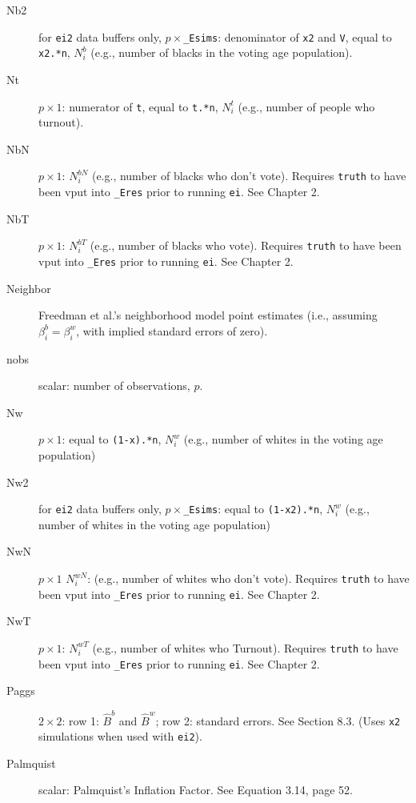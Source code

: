 \documentclass[11pt,titlepage]{article}
\newcommand{\NbN}{{N_i^{bN}}}
\newcommand{\NwN}{{N_i^{wN}}}
\newcommand{\Nbp}{{N_i^{b}}}
\newcommand{\Nwp}{{N_i^{w}}}
\newcommand{\NbV}{{N_i^{bT}}}       %
\newcommand{\NwV}{{N_i^{wT}}}
\begin{document}
\begin{description}
\item[Nb2] for \texttt{ei2} data buffers only,
  $p\times$\texttt{\_Esims}: denominator of \texttt{x2} and
  \texttt{V}, equal to \texttt{x2.*n}, $\Nbp$ (e.g., number of blacks
  in the voting age population).

\item[Nt] $p\times 1$: numerator of \texttt{t}, equal to
  \texttt{t.*n}, $N^t_i$ (e.g., number of people who turnout).

\item[NbN] $p\times1$: $\NbN$ (e.g., number of blacks who don't vote).
  Requires \texttt{truth} to have been vput into \texttt{\_Eres} prior
  to running \texttt{ei}.  See Chapter 2.

\item[NbT] $p\times1$: $\NbV$ (e.g., number of blacks who vote).
  Requires \texttt{truth} to have been vput into \texttt{\_Eres} prior
  to running \texttt{ei}. See Chapter 2.

\item[Neighbor] Freedman et al.'s neighborhood model point estimates
  (i.e., assuming $\beta_i^b=\beta_i^w$, with implied standard errors
  of zero).

\item[nobs] scalar: number of observations, $p$.

\item[Nw] $p\times 1$: equal to \texttt{(1-x).*n}, $\Nwp$ (e.g.,
  number of whites in the voting age population)

\item[Nw2] for \texttt{ei2} data buffers only,
  $p\times$\texttt{\_Esims}: equal to \texttt{(1-x2).*n}, $\Nwp$
  (e.g., number of whites in the voting age population)

\item[NwN] $p\times1$ $\NwN$: (e.g., number of whites who don't vote).
  Requires \texttt{truth} to have been vput into \texttt{\_Eres} prior
  to running \texttt{ei}.  See Chapter 2.

\item[NwT] $p\times1$: $\NwV$ (e.g., number of whites who Turnout).
  Requires \texttt{truth} to have been vput into \texttt{\_Eres} prior
  to running \texttt{ei}. See Chapter 2.

\item[Paggs] $2\times 2$: row 1: $\hat{B}^b$ and $\hat{B}^w$; row 2:
  standard errors.  See Section 8.3.  (Uses \texttt{x2}
  simulations when used with \texttt{ei2}).

\item[Palmquist] scalar: Palmquist's Inflation Factor.  See Equation
  3.14, page 52.


\end{description}
\end{document}
